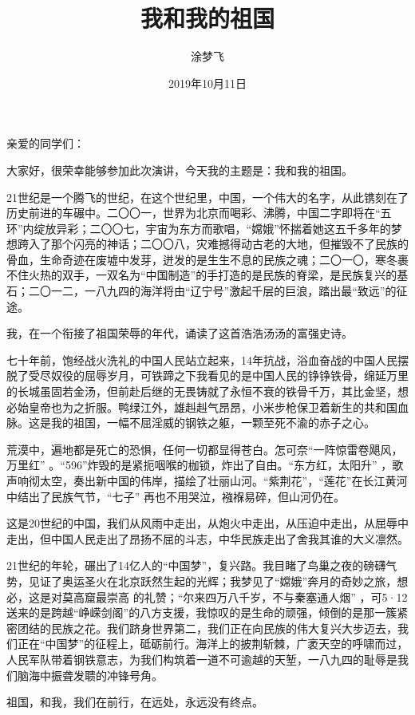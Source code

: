 \documentclass[a4paper, 12pt]{article}
\title{我和我的祖国}
\author{涂梦飞}
\date{2019年10月11日}
\begin{document}
  \maketitle
  亲爱的同学们：
  
  大家好，很荣幸能够参加此次演讲，今天我的主题是：我和我的祖国。
  
  21世纪是一个腾飞的世纪，在这个世纪里，中国，一个伟大的名字，从此镌刻在了历史前进的车碾中。二〇〇一，世界为北京而喝彩、沸腾，中国二字即将在“五环”内绽放异彩；二〇〇七，宇宙为东方而歌唱，“嫦娥”怀揣着她这五千多年的梦想跨入了那个闪亮的神话；二〇〇八，灾难撼得动古老的大地，但摧毁不了民族的骨血，生命奇迹在废墟中发芽，迸发的是生生不息的民族之魂；二〇一〇，寒冬裹不住火热的双手，一双名为“中国制造”的手打造的是民族的脊梁，是民族复兴的基石；二〇一二，一八九四的海洋将由“辽宁号”激起千层的巨浪，踏出最“致远”的征途。
  
  我，在一个衔接了祖国荣辱的年代，诵读了这首浩浩汤汤的富强史诗。

  七十年前，饱经战火洗礼的中国人民站立起来，14年抗战，浴血奋战的中国人民摆脱了受尽奴役的屈辱岁月，可铁蹄之下我看见的是中国人民的铮铮铁骨，绵延万里的长城虽固若金汤，但前赴后继的无畏铸就了永恒不衰的铁骨千万，其比金坚，想必始皇帝也为之折服。鸭绿江外，雄赳赳气昂昂，小米步枪保卫着新生的共和国血脉。这是我的祖国，一幅不屈淫威的钢铁之躯，一颗至死不渝的赤子之心。

  荒漠中，遍地都是死亡的恐惧，任何一切都显得苍白。怎可奈“一阵惊雷卷飓风，万里红”%
  。“596”炸毁的是紧扼咽喉的枷锁，炸出了自由。“东方红，太阳升”%
  ，歌声响彻太空，奏出新中国的伟岸，描绘了壮丽山河。“紫荆花”，“莲花”在长江黄河中结出了民族气节，“七子”%
  再也不用哭泣，襁褓易碎，但山河仍在。

  这是20世纪的中国，我们从风雨中走出，从炮火中走出，从压迫中走出，从屈辱中走出，但中国人民走出了昂扬不屈的斗志，中华民族走出了舍我其谁的大义凛然。

  21世纪的年轮，碾出了14亿人的“中国梦”，复兴路。我目睹了鸟巢之夜的磅礴气势，见证了奥运圣火在北京跃然生起的光辉；我梦见了“嫦娥”奔月的奇妙之旅，想必，这是对莫高窟最崇高%
  的礼赞；“尔来四万八千岁，不与秦塞通人烟”%
  ，可5·12送来的是跨越“峥嵘剑阁”的八方支援，我惊叹的是生命的顽强，倾倒的是那一簇紧密团结的民族之花。我们跻身世界第二，我们正在向民族的伟大复兴大步迈去，我们正在“中国梦”的征程上，砥砺前行。海洋上的披荆斩棘，广袤天空的呼啸而过，人民军队带着钢铁意志，为我们构筑着一道不可逾越的天堑，一八九四的耻辱是我们脑海中振聋发聩的冲锋号角。

  祖国，和我，我们在前行，在远处，永远没有终点。
\end{document}
